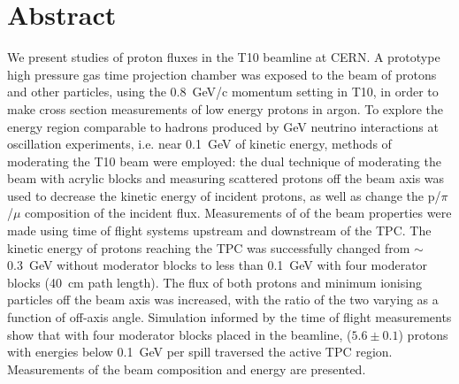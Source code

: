 \section*{Abstract}
We present studies of proton fluxes in the T10 beamline at CERN.
A prototype high pressure gas time projection chamber was exposed to the beam of protons and other particles, using the 0.8~GeV/c momentum setting in T10, in order to make cross section measurements of low energy protons in argon.
To explore the energy region comparable to hadrons produced by GeV neutrino interactions at oscillation experiments, i.e. near 0.1~GeV of kinetic energy, methods of moderating the T10 beam were employed:
the dual technique of moderating the beam with acrylic blocks and measuring scattered protons off the beam axis was used to decrease the kinetic energy of incident protons, as well as change the p/$\pi$/$\mu$ composition of the incident flux.
Measurements of of the beam properties were made using time of flight systems upstream and downstream of the TPC. 
The kinetic energy of protons reaching the TPC was successfully changed from $\sim$0.3~GeV without moderator blocks to less than 0.1~GeV with four moderator blocks (40~cm path length).
The flux of both protons and minimum ionising particles off the beam axis was increased, with the ratio of the two varying as a function of off-axis angle. 
Simulation informed by the time of flight measurements show that with four moderator blocks placed in the beamline,  ($5.6 \pm 0.1$) protons with energies below 0.1~GeV per spill traversed the active TPC region.
Measurements of the beam composition and energy are presented.
